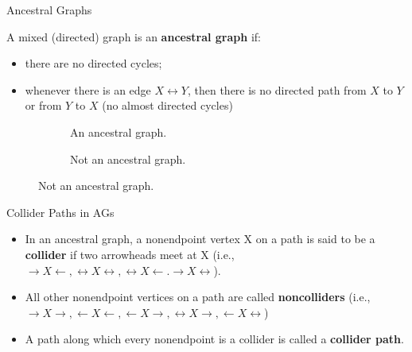 \documentclass[english, compress, red]{beamer}
\begin{document}
\begin{frame}{Ancestral Graphs}
	\begin{definition}A mixed (directed) graph is an \textbf{ancestral graph} if:
		\begin{itemize}
			\item there are no directed cycles;
			\item whenever there is an edge $X \leftrightarrow Y$, then there is no directed path from $X$ to $Y$ or from $Y$ to $X$ (no almost directed cycles)
		\end{itemize}
	\end{definition}

\begin{figure}
\begin{subfigure}{0.48\textwidth}
	\centering
	\caption{An ancestral graph.}
\end{subfigure}
\hfill
\begin{subfigure}{0.48\textwidth}
	\centering
	\caption{Not an ancestral graph.}
\end{subfigure}
\end{figure}
\end{frame}

\begin{frame}{Collider Paths in AGs}
	\begin{definition}
		\begin{itemize}
			\item In an ancestral graph, a nonendpoint vertex X on a path is said to be a \textbf{collider} if two arrowheads meet at X (i.e., $\rightarrow X \leftarrow, \leftrightarrow X \leftrightarrow, \leftrightarrow X \leftarrow. \rightarrow X \leftrightarrow$).
		    \item All other nonendpoint vertices on a path are called \textbf{noncolliders} (i.e., $\rightarrow X \rightarrow, \leftarrow X \leftarrow, \leftarrow X \rightarrow, \leftrightarrow X \rightarrow, \leftarrow X \leftrightarrow$)
			\item A path along which every nonendpoint is a collider is called a \textbf{collider path}.
		\end{itemize}
	\end{definition}
\end{frame}
\end{document}
